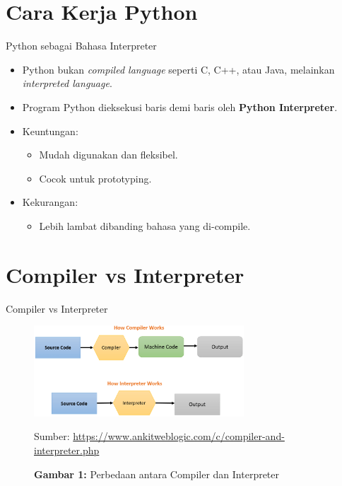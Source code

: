 \documentclass[aspectratio=169, table]{beamer}
\begin{document}
\section{Cara Kerja Python}
\begin{frame}{Python sebagai Bahasa Interpreter}
\begin{itemize}
\item Python bukan \textit{compiled language} seperti C, C++, atau Java, melainkan \textit{interpreted language}.
\item Program Python dieksekusi baris demi baris oleh \textbf{Python Interpreter}.
\item Keuntungan:
	\begin{itemize}
	\item Mudah digunakan dan fleksibel.
	\item Cocok untuk prototyping.
	\end{itemize}
\item Kekurangan:
	\begin{itemize}
	\item Lebih lambat dibanding bahasa yang di-compile.
	\end{itemize}
\end{itemize}
\end{frame}

\section{Compiler vs Interpreter}
\begin{frame}{Compiler vs Interpreter}
\begin{figure}[h]
	\centering
	\includegraphics[width=0.7\textwidth]{../../../shared_assets/images/compiler_vs_interpreter.png}
	\caption*{\textbf{Gambar 1:} Perbedaan antara Compiler dan Interpreter}
	\smallskip
    {\tiny Sumber: \url{https://www.ankitweblogic.com/c/compiler-and-interpreter.php}}
\end{figure}
\end{frame}
\end{document}
